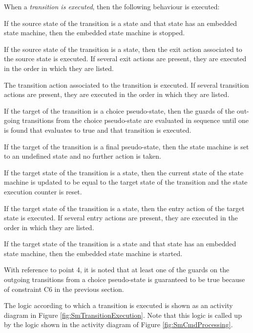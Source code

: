 \documentclass[a4paper,10pt]{article}
\newenvironment{fw_enumerate}					%
{\begin{enumerate}
  \setlength{\itemsep}{1mm}
  \setlength{\parskip}{0pt}
  \setlength{\parsep}{0pt}}
{\end{enumerate}}
\begin{document}
When a \emph{transition is executed}, then the following behaviour is executed:
\begin{fw_enumerate}
\item If the source state of the transition is a state and that state has an embedded state
machine, then the embedded state machine is stopped.
\item If the source state of the transition is a state, then the exit action associated to the
source state is executed. If several exit actions are present, they are executed in the
order in which they are listed.
\item The transition action associated to the transition is executed. If several transition
actions are present, they are executed in the order in which they are listed.
\item If the target of the transition is a choice pseudo-state, then the guards of the out-going
transitions from the choice pseudo-state are evaluated in sequence until one is found
that evaluates to true and that transition is executed.
\item If the target of the transition is a final pseudo-state, then the state machine is set to an
undefined state and no further action is taken.
\item If the target state of the transition is a state, then the current state of the state machine
is updated to be equal to the target state of the transition and the state execution counter is
reset.
\item If the target state of the transition is a state, then the entry action of the target state is
executed. If several entry actions are present, they are executed in the order in which
they are listed.
\item If the target state of the transition is a state and that state has an embedded state
machine, then the embedded state machine is started.
\end{fw_enumerate}

With reference to point 4, it is noted that at least one of the guards on the outgoing transitions
from a choice pseudo-state is guaranteed to be true because of constraint C6 in the previous
section.

The logic according to which a transition is executed is shown as an activity diagram in Figure \ref{fig:SmTransitionExecution}. 
Note that this logic is called up by the logic shown in the activity diagram of Figure \ref{fig:SmCmdProcessing}.
\end{document}
